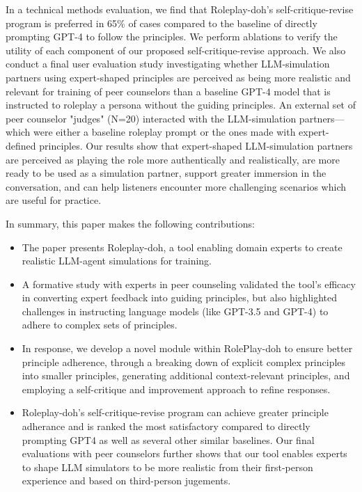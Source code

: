 In a technical methods evaluation, we find that Roleplay-doh's self-critique-revise program is preferred in 65\% of cases compared to the baseline of directly prompting GPT-4 to follow the principles.  We perform ablations to verify the utility of each component of our proposed self-critique-revise approach. We also conduct a final user evaluation study investigating whether LLM-simulation partners using expert-shaped principles are perceived as being more realistic and relevant for training of peer counselors than a baseline GPT-4 model that is instructed to roleplay a persona without the guiding principles.
An external set of peer counselor "judges" (N=20) interacted with the LLM-simulation partners---which were either a baseline roleplay prompt or the ones made with expert-defined principles.
Our results show that expert-shaped LLM-simulation partners are perceived as playing the role more authentically and realistically, are more ready to be used as a simulation partner, support greater immersion in the conversation, and can help listeners encounter more challenging scenarios which are useful for practice. 



In summary, this paper makes the following contributions:
\begin{itemize}
    \item The paper presents Roleplay-doh, a tool enabling domain experts to create realistic LLM-agent simulations for training.
    \item A formative study with experts in peer counseling validated the tool's efficacy in converting expert feedback into guiding principles, but also highlighted challenges in instructing language models (like GPT-3.5 and GPT-4) to adhere to complex sets of principles.
    \item In response, we develop a novel module within RolePlay-doh to ensure better principle adherence, through a breaking down of explicit complex principles into smaller principles, generating additional context-relevant principles, and employing a self-critique and improvement approach to refine responses. 
    \item Roleplay-doh's self-critique-revise program can achieve greater principle adherance and is ranked the most satisfactory compared to directly prompting GPT4 as well as several other similar baselines. Our final evaluations with peer counselors further shows that our tool enables experts to shape LLM simulators to be more realistic from their first-person experience and based on third-person jugements.
\end{itemize}

